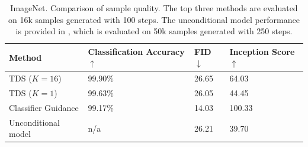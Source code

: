 \begin{table}[!t]
\centering 
\begin{tabular}{|l|l|l|l|}
\hline
Method               & Classification Accuracy $\uparrow$ & FID $\downarrow$   & Inception Score $\uparrow$    \\ \hline
TDS ($K=16$)           & 99.90\%                 & 26.65 & 64.03  \\ \hline
TDS ($K=1$)            &  99.63\%                & 26.05 & 44.45       \\ \hline
Classifier Guidance  & 99.17\%                 & 14.03 & 100.33 \\ \hline
Unconditional model             & n/a                     & 26.21 & 39.70  \\ \hline
\end{tabular}
\label{tab:inet-comparison}
\caption{ImageNet. Comparison of sample quality. The top three methods are evaluated on 16k samples generated with 100 steps. The unconditional model performance is provided in \citep{dhariwal2021diffusion}, which is evaluated on 50k samples generated with 250 steps.}
\end{table}